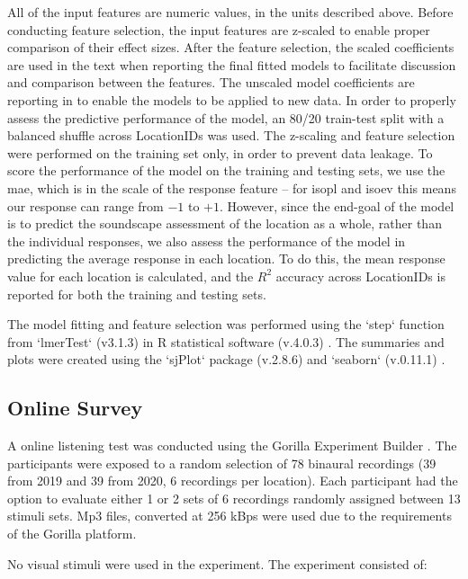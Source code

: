    All of the input features are numeric values, in the units described above. Before conducting feature selection, the input features are z-scaled to enable proper comparison of their effect sizes. After the feature selection, the scaled coefficients are used in the text when reporting the final fitted models to facilitate discussion and comparison between the features. The unscaled model coefficients are reporting in  to enable the models to be applied to new data. In order to properly assess the predictive performance of the model, an 80/20 train-test split with a balanced shuffle across LocationIDs was used. The z-scaling and feature selection were performed on the training set only, in order to prevent data leakage. To score the performance of the model on the training and testing sets, we use the \gls{mae}, which is in the scale of the response feature -- for \gls{isopl} and \gls{isoev} this means our response can range from $-1$ to $+1$. However, since the end-goal of the model is to predict the soundscape assessment of the location as a whole, rather than the individual responses, we also assess the performance of the model in predicting the average response in each location. To do this, the mean response value for each location is calculated, and the $R^2$ accuracy across LocationIDs is reported for both the training and testing sets.

   The model fitting and feature selection was performed using the `step` function from `lmerTest` (v3.1.3) \citep{Kuznetsova2017lmerTest} in R statistical software (v.4.0.3) \citep{RCT2021R}. The summaries and plots were created using the `sjPlot` package (v.2.8.6) \citep{Luedecke2021sjPlot} and `seaborn` (v.0.11.1) \citep{Waskom2021seaborn}.

 \subsection{Online Survey}

   A online listening test was conducted using the Gorilla Experiment Builder \href{www.275gorilla.sc}{} \citep{AnwylIrvine2020Gorilla}. The participants were exposed to a random selection of 78 binaural recordings (39 from 2019 and 39 from 2020, 6 recordings per location). Each participant had the option to evaluate either 1 or 2 sets of 6 recordings randomly assigned between 13 stimuli sets. Mp3 files, converted at 256 kBps were used due to the requirements of the Gorilla platform.

   No visual stimuli were used in the experiment. The experiment consisted of:

